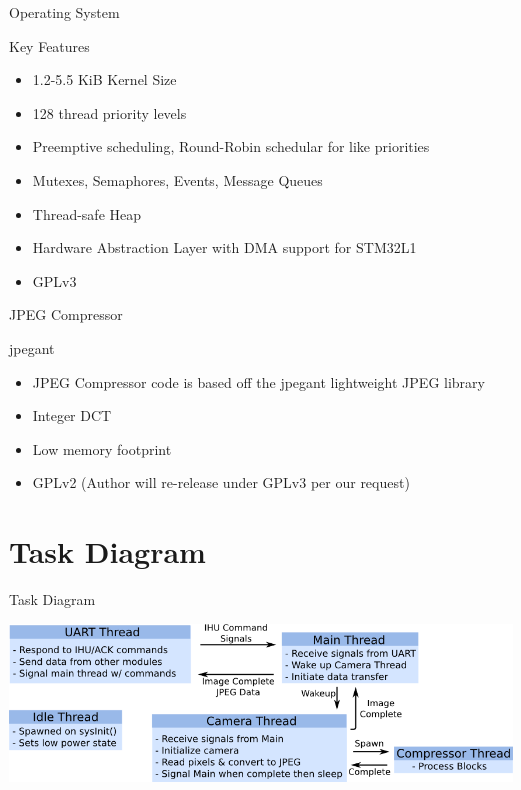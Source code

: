\documentclass{beamer}
\begin{document}
\begin{frame}{Operating System}
	\begin{block}{Key Features}
		\begin{itemize}
			\item 1.2-5.5 KiB Kernel Size
			\item 128 thread priority levels
			\item Preemptive scheduling, Round-Robin schedular for like priorities
			\item Mutexes, Semaphores, Events, Message Queues
			\item Thread-safe Heap
			\item Hardware Abstraction Layer with DMA support for STM32L1
			\item GPLv3
		\end{itemize}
	\end{block}
\end{frame}

\begin{frame}{JPEG Compressor}
	\begin{block}{jpegant}
		\begin{itemize}
			\item JPEG Compressor code is based off the jpegant lightweight JPEG library
			\item Integer DCT
			\item Low memory footprint
			\item GPLv2 (Author will re-release under GPLv3 per our request)
		\end{itemize}
	\end{block}
\end{frame}

\section{Task Diagram}
\begin{frame}{Task Diagram}
	\begin{center}
        \includegraphics[scale=0.5]{task_diagram.png}
	\end{center}
\end{frame}
\end{document}
